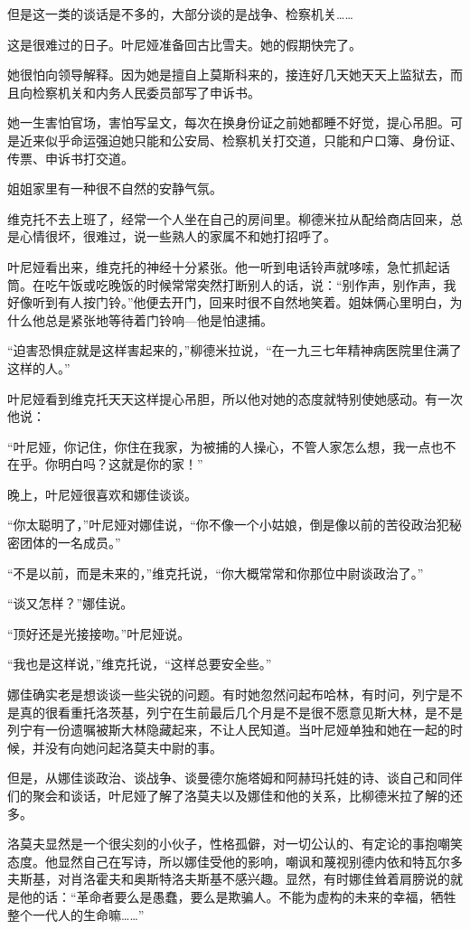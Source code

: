 但是这一类的谈话是不多的，大部分谈的是战争、检察机关……

这是很难过的日子。叶尼娅准备回古比雪夫。她的假期快完了。

她很怕向领导解释。因为她是擅自上莫斯科来的，接连好几天她天天上监狱去，而且向检察机关和内务人民委员部写了申诉书。

她一生害怕官场，害怕写呈文，每次在换身份证之前她都睡不好觉，提心吊胆。可是近来似乎命运强迫她只能和公安局、检察机关打交道，只能和户口簿、身份证、传票、申诉书打交道。

姐姐家里有一种很不自然的安静气氛。

维克托不去上班了，经常一个人坐在自己的房间里。柳德米拉从配给商店回来，总是心情很坏，很难过，说一些熟人的家属不和她打招呼了。

叶尼娅看出来，维克托的神经十分紧张。他一听到电话铃声就哆嗦，急忙抓起话筒。在吃午饭或吃晚饭的时候常常突然打断别人的话，说：“别作声，别作声，我好像听到有人按门铃。”他便去开门，回来时很不自然地笑着。姐妹俩心里明白，为什么他总是紧张地等待着门铃响—他是怕逮捕。

“迫害恐惧症就是这样害起来的，”柳德米拉说，“在一九三七年精神病医院里住满了这样的人。”

叶尼娅看到维克托天天这样提心吊胆，所以他对她的态度就特别使她感动。有一次他说：

“叶尼娅，你记住，你住在我家，为被捕的人操心，不管人家怎么想，我一点也不在乎。你明白吗？这就是你的家！”

晚上，叶尼娅很喜欢和娜佳谈谈。

“你太聪明了，”叶尼娅对娜佳说，“你不像一个小姑娘，倒是像以前的苦役政治犯秘密团体的一名成员。”

“不是以前，而是未来的，”维克托说，“你大概常常和你那位中尉谈政治了。”

“谈又怎样？”娜佳说。

“顶好还是光接接吻。”叶尼娅说。

“我也是这样说，”维克托说，“这样总要安全些。”

娜佳确实老是想谈谈一些尖锐的问题。有时她忽然问起布哈林，有时问，列宁是不是真的很看重托洛茨基，列宁在生前最后几个月是不是很不愿意见斯大林，是不是列宁有一份遗嘱被斯大林隐藏起来，不让人民知道。当叶尼娅单独和她在一起的时候，并没有向她问起洛莫夫中尉的事。

但是，从娜佳谈政治、谈战争、谈曼德尔施塔姆和阿赫玛托娃的诗、谈自己和同伴们的聚会和谈话，叶尼娅了解了洛莫夫以及娜佳和他的关系，比柳德米拉了解的还多。

洛莫夫显然是一个很尖刻的小伙子，性格孤僻，对一切公认的、有定论的事抱嘲笑态度。他显然自己在写诗，所以娜佳受他的影响，嘲讽和蔑视别德内依和特瓦尔多夫斯基，对肖洛霍夫和奥斯特洛夫斯基不感兴趣。显然，有时娜佳耸着肩膀说的就是他的话：“革命者要么是愚蠢，要么是欺骗人。不能为虚构的未来的幸福，牺牲整个一代人的生命嘛……”


